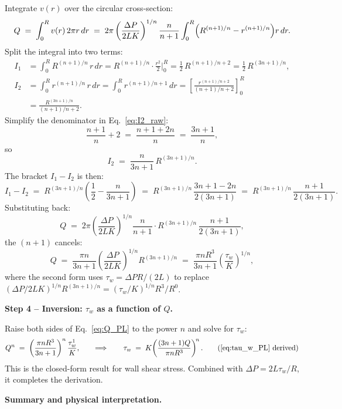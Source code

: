 \documentclass[11pt,a4paper]{article}
\begin{document}
\begin{derivationbox}[title={DERIVATION --- Power-Law pipe flow: velocity profile, $Q(\tau_w)$, and inversion to $\tau_w(Q)$}]
Integrate $v(r)$ over the circular cross-section:
\[
Q \;=\; \int_0^R v(r)\,2\pi r\,dr
    \;=\; 2\pi\left(\frac{\Delta P}{2LK}\right)^{1/n}
          \frac{n}{n+1}
          \int_0^R \Bigl(R^{(n+1)/n}-r^{(n+1)/n}\Bigr)r\,dr.
\]
Split the integral into two terms:
\begin{align}
I_1 &= \int_0^R R^{(n+1)/n}\,r\,dr
     = R^{(n+1)/n}\cdot\frac{r^2}{2}\Biggr|_0^R
     = \frac{1}{2}\,R^{(n+1)/n+2}
     = \frac{1}{2}\,R^{(3n+1)/n}, \label{eq:I1}\\[4pt]
I_2 &= \int_0^R r^{(n+1)/n}\,r\,dr
     = \int_0^R r^{(n+1)/n+1}\,dr
     = \left[\frac{r^{(n+1)/n+2}}{(n+1)/n+2}\right]_0^R
     \nonumber\\
    &= \frac{R^{(3n+1)/n}}{(n+1)/n+2}. \label{eq:I2_raw}
\end{align}
Simplify the denominator in Eq.~\eqref{eq:I2_raw}:
\[
\frac{n+1}{n}+2 \;=\; \frac{n+1+2n}{n} \;=\; \frac{3n+1}{n},
\]
so
\begin{equation}
I_2 \;=\; \frac{n}{3n+1}\,R^{(3n+1)/n}. \label{eq:I2}
\end{equation}
The bracket $I_1-I_2$ is then:
\[
I_1 - I_2
\;=\; R^{(3n+1)/n}
      \left(\frac{1}{2} - \frac{n}{3n+1}\right)
\;=\; R^{(3n+1)/n}\,\frac{3n+1-2n}{2(3n+1)}
\;=\; R^{(3n+1)/n}\,\frac{n+1}{2(3n+1)}.
\]
Substituting back:
\[
Q \;=\; 2\pi\left(\frac{\Delta P}{2LK}\right)^{1/n}\!
        \frac{n}{n+1}\cdot
        R^{(3n+1)/n}\,\frac{n+1}{2(3n+1)},
\]
the $(n+1)$ cancels:
\begin{equation}
Q \;=\; \frac{\pi n}{3n+1}
        \left(\frac{\Delta P}{2LK}\right)^{1/n}
        R^{(3n+1)/n}
\;=\; \frac{\pi n R^3}{3n+1}
      \left(\frac{\tau_w}{K}\right)^{1/n},
\label{eq:Q_PL}
\end{equation}
where the second form uses $\tau_w=\Delta P R/(2L)$ to replace
$(\Delta P/2LK)^{1/n}R^{(3n+1)/n}=(\tau_w/K)^{1/n}R^3/R^0$.

\medskip\noindent\textbf{Step 4 -- Inversion: $\tau_w$ as a function of $Q$.}

Raise both sides of Eq.~\eqref{eq:Q_PL} to the power $n$ and solve for
$\tau_w$:
\[
Q^n \;=\; \left(\frac{\pi n R^3}{3n+1}\right)^n
           \frac{\tau_w^1}{K},
\qquad\Longrightarrow\qquad
\tau_w \;=\; K\!\left(\frac{(3n+1)Q}{\pi n R^3}\right)^{\!n}.
\tag{\ref{eq:tau_w_PL} derived}
\]
This is the closed-form result for wall shear stress. Combined with
$\Delta P=2L\tau_w/R$, it completes the derivation.

\medskip\noindent\textbf{Summary and physical interpretation.}


\end{derivationbox}
\end{document}
